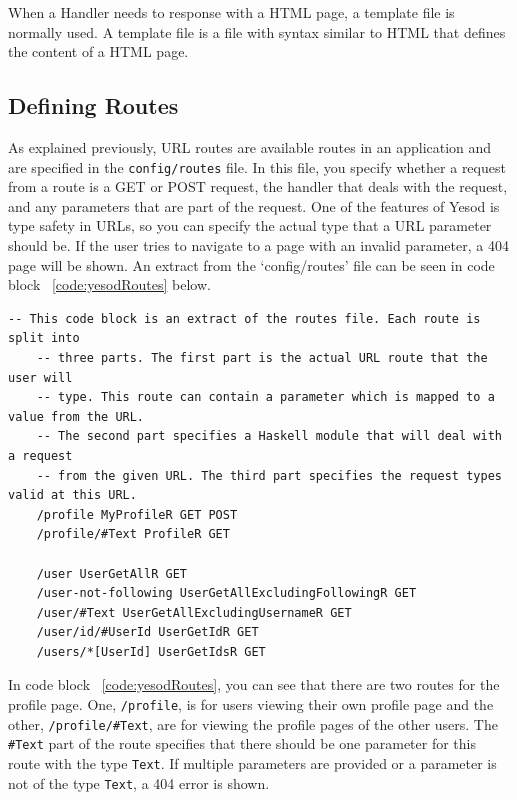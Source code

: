 When a Handler needs to response with a HTML page, a template file is
normally used. A template file is a file with syntax similar to HTML
that defines the content of a HTML page.

\subsection{Defining Routes}

As explained previously, URL routes are available routes in an application and are specified in the 
\texttt{config/routes} file. In this file, you specify whether a request from a route is a
GET or POST request, the handler that deals with the request, and any parameters
that are part of the request. One of the features of Yesod is type safety in URLs,
so you can specify the actual type that a URL parameter should be. If the user
tries to navigate to a page with an invalid parameter, a 404 page will be shown.
An extract from the `config/routes' file can be seen in code block 
~\ref{code:yesodRoutes} below.


\begin{lstlisting}[caption={Yesod URL routes},label={code:yesodRoutes}]
	-- This code block is an extract of the routes file. Each route is split into
	-- three parts. The first part is the actual URL route that the user will
	-- type. This route can contain a parameter which is mapped to a value from the URL.
	-- The second part specifies a Haskell module that will deal with a request
	-- from the given URL. The third part specifies the request types valid at this URL.
	/profile MyProfileR GET POST
	/profile/#Text ProfileR GET
	
	/user UserGetAllR GET
	/user-not-following UserGetAllExcludingFollowingR GET
	/user/#Text UserGetAllExcludingUsernameR GET
	/user/id/#UserId UserGetIdR GET
	/users/*[UserId] UserGetIdsR GET
\end{lstlisting}

In code block ~\ref{code:yesodRoutes}, you can see that there
are two routes for the profile page. One, \texttt{/profile}, is for users
viewing their own profile page and the other, \texttt{/profile/\#Text}, are
for viewing the profile pages of the other users. The \texttt{\#Text} part
of the route specifies that there should be one parameter for this
route with the type \texttt{Text}. If multiple parameters are provided or a parameter
is not of the type \texttt{Text}, a 404 error is shown.

